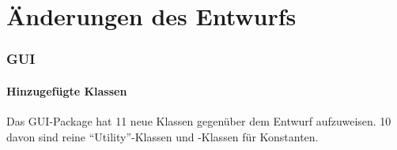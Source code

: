 \part{Änderungen des Entwurfs}


\section{GUI}

\subsection{Hinzugefügte Klassen}


Das GUI-Package hat 11 neue Klassen gegenüber dem Entwurf aufzuweisen. 10 davon sind reine \enquote{Utility}-Klassen und -Klassen für Konstanten.

